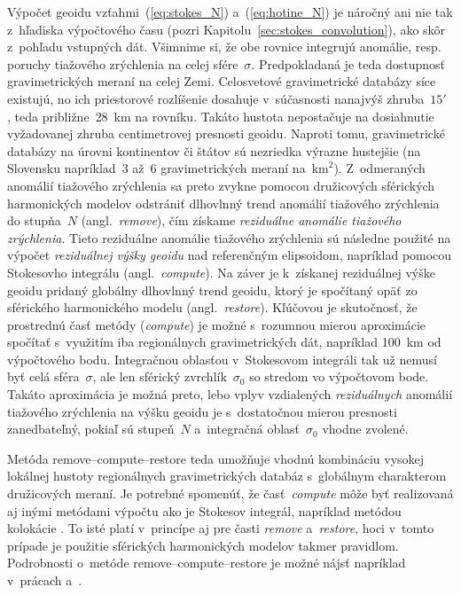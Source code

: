 \documentclass[a4paper, 12pt]{book}
\begin{document}
Výpočet geoidu vzťahmi~(\ref{eq:stokes_N}) a~(\ref{eq:hotine_N}) je náročný ani 
nie tak z~hľadiska výpočtového času (pozri 
Kapitolu~\ref{sec:stokes_convolution}), ako skôr z~pohľadu vstupných dát.  
Všimnime si, že obe rovnice integrujú anomálie, resp. poruchy tiažového 
zrýchlenia na celej sfére~$\sigma$.  Predpokladaná je teda dostupnosť 
gravimetrických meraní na celej Zemi.  Celosvetové gravimetrické databázy síce 
existujú, no ich priestorové rozlíšenie dosahuje v~súčasnosti nanajvýš 
zhruba~$15'$ \parencite{EGM2008,Pail2018}, teda približne~$28$~km na rovníku.  
Takáto hustota nepostačuje na dosiahnutie vyžadovanej zhruba centimetrovej 
presnosti geoidu.  Naproti tomu, gravimetrické databázy na úrovni kontinentov 
či štátov sú nezriedka výrazne hustejšie (na Slovensku napríklad~3 až~6 
gravimetrických meraní na~$\textrm{km}^2$).  Z~odmeraných anomálií tiažového 
zrýchlenia sa preto zvykne pomocou družicových sférických harmonických modelov 
odstrániť dlhovlnný trend anomálií tiažového zrýchlenia do stupňa~$N$ 
(angl.~\emph{remove}), čím získame \emph{reziduálne anomálie tiažového 
zrýchlenia}.  Tieto reziduálne anomálie tiažového zrýchlenia sú následne 
použité na výpočet \emph{reziduálnej výšky geoidu} nad referenčným elipsoidom, 
napríklad pomocou Stokesovho integrálu (angl.~\emph{compute}).  Na záver je 
k~získanej reziduálnej výške geoidu pridaný globálny dlhovlnný trend geoidu, 
ktorý je spočítaný opäť zo sférického harmonického modelu 
(angl.~\emph{restore}).  Kľúčovou je skutočnosť, že prostrednú časť metódy 
(\emph{compute}) je možné s~rozumnou mierou aproximácie spočítať s~využitím iba 
regionálnych gravimetrických dát, napríklad 100~km od výpočtového bodu.  
Integračnou oblasťou v~Stokesovom integráli tak už nemusí byť celá 
sféra~$\sigma$, ale len sférický zvrchlík~$\sigma_0$ so stredom vo výpočtovom 
bode.  Takáto aproximácia je možná preto, lebo vplyv vzdialených 
\emph{reziduálnych} anomálií tiažového zrýchlenia na výšku geoidu je 
s~dostatočnou mierou presnosti zanedbateľný, pokiaľ sú stupeň~$N$ a~integračná 
oblasť~$\sigma_0$ vhodne zvolené.

Metóda remove--compute--restore teda umožňuje vhodnú kombináciu vysokej 
lokálnej hustoty regionálnych gravimetrických databáz s~globálnym charakterom 
družicových meraní.  Je potrebné spomenúť, že časť~\emph{compute} môže byť 
realizovaná aj inými metódami výpočtu ako je Stokesov integrál, napríklad 
metódou kolokácie \parencite{MoritzAdvancedGeodesy,MoritzPhysicalGeodesy}.  To 
isté platí v~princípe aj pre časti \emph{remove} a~\emph{restore}, hoci v~tomto 
prípade je použitie sférických harmonických modelov takmer pravidlom.  
Podrobnosti o~metóde remove--compute--restore je možné nájsť napríklad 
v~prácach \textcite{Sjoberg2005} a~\textcite{MoritzPhysicalGeodesy}.
\end{document}
